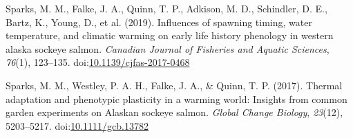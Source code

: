 \documentclass[12pt,halfline,a4paper,]{ouparticle}
\newlength{\cslhangindent}
\newenvironment{CSLReferences}[2] %
 {\begin{list}{}{%
  \setlength{\itemindent}{0pt}
  \setlength{\leftmargin}{0pt}
  \setlength{\parsep}{0pt}
  \ifodd #1
   \setlength{\leftmargin}{\cslhangindent}
   \setlength{\itemindent}{-1\cslhangindent}
  \fi
  \setlength{\itemsep}{#2\baselineskip}}}
 {\end{list}}
\begin{document}
\begin{CSLReferences}{1}{0}
Sparks, M. M., Falke, J. A., Quinn, T. P., Adkison, M. D., Schindler, D.
E., Bartz, K., Young, D., et al. (2019). Influences of spawning timing,
water temperature, and climatic warming on early life history phenology
in western alaska sockeye salmon. \emph{Canadian Journal of Fisheries
and Aquatic Sciences}, \emph{76}(1), 123--135.
doi:\href{https://doi.org/10.1139/cjfas-2017-0468}{10.1139/cjfas-2017-0468}

Sparks, M. M., Westley, P. A. H., Falke, J. A., \& Quinn, T. P. (2017).
Thermal adaptation and phenotypic plasticity in a warming world:
Insights from common garden experiments on Alaskan sockeye salmon.
\emph{Global Change Biology}, \emph{23}(12), 5203--5217.
doi:\href{https://doi.org/10.1111/gcb.13782}{10.1111/gcb.13782}

\end{CSLReferences}
\end{document}
